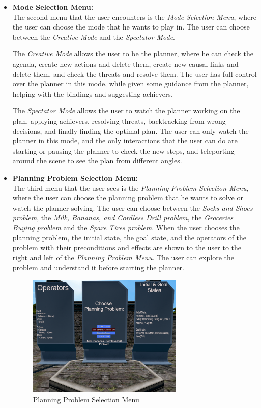 \begin{itemize}
    \item \textbf{Mode Selection Menu:} \\
          The second menu that the user encounters is the \textit{Mode Selection Menu}, where the user can choose the mode that he wants to play in. The user can choose between the \textit{Creative Mode} and the \textit{Spectator Mode}.

          The \textit{Creative Mode} allows the user to be the planner, where he can check the agenda, create new actions and delete them, create new causal links and delete them, and check the threats and resolve them. The user has full control over the planner in this mode, while given some guidance from the planner, helping with the bindings and suggesting achievers.

          The \textit{Spectator Mode} allows the user to watch the planner working on the plan, applying achievers, resolving threats, backtracking from wrong decisions, and finally finding the optimal plan. The user can only watch the planner in this mode, and the only interactions that the user can do are starting or pausing the planner to check the new steps, and teleporting around the scene to see the plan from different angles.

    \item \textbf{Planning Problem Selection Menu:} \\
          The third menu that the user sees is the \textit{Planning Problem Selection Menu}, where the user can choose the planning problem that he wants to solve or watch the planner solving. The user can choose between the \textit{Socks and Shoes problem}, the \textit{Milk, Bananas, and Cordless Drill problem}, the \textit{Groceries Buying problem} and the \textit{Spare Tires problem}. When the user chooses the planning problem, the initial state, the goal state, and the operators of the problem with their preconditions and effects are shown to the user to the right and left of the \textit{Planning Problem Menu}. The user can explore the problem and understand it before starting the planner.

          \begin{figure}[H]
              \centering
              \includegraphics[width=0.7\textwidth]{images/planning_problem.png}
              \caption[Planning Problem Selection Menu in VR]{Planning Problem Selection Menu}
              \label{fig:vr_problem_selection_menu}
          \end{figure}


\end{itemize}
